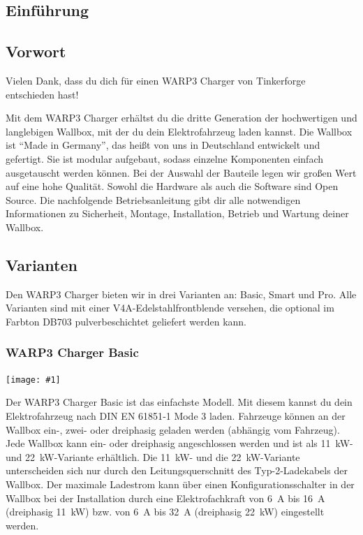 \documentclass[a4paper,10pt]{article}
\newcommand{\gfx}[1]{\texttt{[image: \#1]}}
\begin{document}
\begin{multicols*}{2}
    \tableofcontents
    \newpage
    \section{Einführung}
    \subsection{Vorwort} Vielen Dank, dass du
    dich für einen WARP3 Charger von Tinkerforge entschieden hast!

    Mit dem WARP3 Charger
    erhältst du die dritte Generation der hochwertigen und langlebigen Wallbox,
    mit der du dein Elektrofahrzeug laden kannst.
    Die Wallbox ist \enquote{Made in Germany}, das heißt von uns in
	Deutschland entwickelt und gefertigt. Sie ist modular aufgebaut, sodass
    einzelne Komponenten einfach ausgetauscht werden können. Bei der Auswahl der
	Bauteile legen wir großen Wert auf eine hohe Qualität. Sowohl die Hardware als
    auch die Software sind Open Source. Die nachfolgende Betriebsanleitung gibt dir
    alle notwendigen Informationen zu Sicherheit, Montage, Installation, Betrieb
    und Wartung deiner Wallbox.

    \subsection{Varianten}
    Den WARP3 Charger bieten wir in drei Varianten an: Basic, Smart und Pro.
	Alle Varianten sind mit einer V4A-Edelstahlfrontblende versehen,
	die optional im Farbton DB703 pulverbeschichtet geliefert werden kann.

	\subsubsection*{WARP3 Charger Basic}
	\gfx{./img_warp3/resized/warp3_basic_open}

    Der WARP3 Charger Basic ist das einfachste Modell. Mit diesem kannst du dein
    Elektrofahrzeug nach DIN EN 61851‐1 Mode 3 laden.
    Fahrzeuge können an der Wallbox ein-, zwei- oder dreiphasig geladen werden
    (abhängig vom Fahrzeug). Jede Wallbox kann ein- oder dreiphasig
    angeschlossen werden und ist als \SI{11}{\kilo\watt}- und
    \SI{22}{\kilo\watt}-Variante erhältlich. Die \SI{11}{\kilo\watt}- und
    die \SI{22}{\kilo\watt}-Variante unterscheiden sich nur durch den
    Leitungsquerschnitt des Typ-2-Ladekabels der Wallbox. Der maximale Ladestrom
    kann über einen Konfigurationsschalter in der Wallbox bei der Installation durch eine Elektrofachkraft von \SI{6}{\ampere} bis \SI{16}{\ampere}
    (dreiphasig \SI{11}{\kilo\watt}) bzw. von \SI{6}{\ampere} bis \SI{32}{\ampere} (dreiphasig \SI{22}{\kilo\watt}) eingestellt werden.


\end{multicols*}
\end{document}
